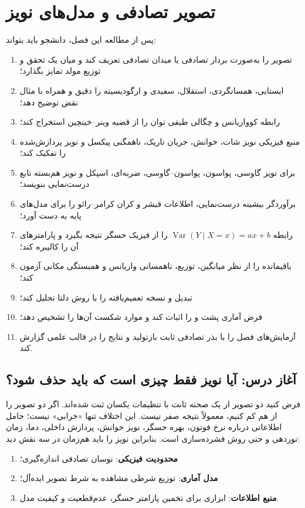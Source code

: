 \documentclass[12pt,openany,oneside]{book}
\newcommand{\Var}{\operatorname{Var}}
\begin{document}
\tableofcontents

\mainmatter
\setcounter{chapter}{3}
\chapter{تصویر تصادفی و مدل‌های نویز}
\label{ch:random-noise}

\begin{learningbox}
پس از مطالعه این فصل، دانشجو باید بتواند:
\begin{enumerate}
\item تصویر را به‌صورت بردار تصادفی یا میدان تصادفی تعریف کند و میان یک تحقق و توزیع مولد تمایز بگذارد؛
\item ایستایی، همسانگردی، استقلال، سفیدی و ارگودیسیته را دقیق و همراه با مثال نقض توضیح دهد؛
\item رابطه کوواریانس و چگالی طیفی توان را از قضیه وینر--خینچین استخراج کند؛
\item منبع فیزیکی نویز شات، خوانش، جریان تاریک، ناهمگنی پیکسل و نویز پردازش‌شده را تفکیک کند؛
\item برای نویز گاوسی، پواسون، پواسون--گاوسی، ضربه‌ای، اسپکل و نویز هم‌بسته تابع درست‌نمایی بنویسد؛
\item برآوردگر بیشینه درست‌نمایی، اطلاعات فیشر و کران کرامر--رائو را برای مدل‌های پایه به دست آورد؛
\item رابطه \(\Var(Y\mid X=x)=ax+b\) را از فیزیک حسگر نتیجه بگیرد و پارامترهای آن را کالیبره کند؛
\item باقیمانده را از نظر میانگین، توزیع، ناهمسانی واریانس و همبستگی مکانی آزمون کند؛
\item تبدیل  و نسخه تعمیم‌یافته را با روش دلتا تحلیل کند؛
\item فرض آماری پشت  و  را اثبات کند و موارد شکست آن‌ها را تشخیص دهد؛
\item آزمایش‌های فصل را با بذر تصادفی ثابت بازتولید و نتایج را در قالب علمی گزارش کند.
\end{enumerate}
\end{learningbox}

\section{آغاز درس: آیا نویز فقط چیزی است که باید حذف شود؟}

فرض کنید دو تصویر از یک صحنه ثابت با تنظیمات یکسان ثبت شده‌اند. اگر دو تصویر را از هم کم کنیم،
معمولاً نتیجه صفر نیست. این اختلاف تنها «خرابی» نیست؛ حامل اطلاعاتی درباره نرخ فوتون، بهره حسگر،
نویز خوانش، پردازش داخلی، دما، زمان نوردهی و حتی روش فشرده‌سازی است. بنابراین نویز را باید هم‌زمان
در سه نقش دید:
\begin{enumerate}
\item \textbf{محدودیت فیزیکی}: نوسان تصادفی اندازه‌گیری؛
\item \textbf{مدل آماری}: توزیع شرطی مشاهده به شرط تصویر ایده‌آل؛
\item \textbf{منبع اطلاعات}: ابزاری برای تخمین پارامتر حسگر، عدم‌قطعیت و کیفیت مدل.
\end{enumerate}
\end{document}
